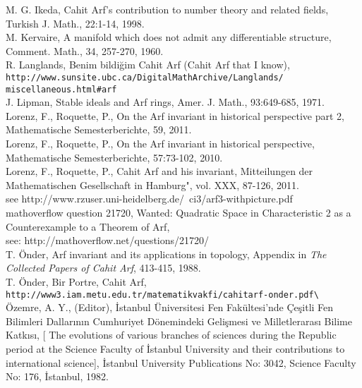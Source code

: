 \documentclass[12pt]{amsart}
\begin{document}
\begin{thebibliography}{10}
 M. G. Ikeda, Cahit Arf's contribution to number theory and related fields, Turkish J. Math., 22:1-14, 1998. \\

 M. Kervaire, A manifold which does not admit any differentiable structure, Comment. Math., 34, 257-270, 1960.\\

 R. Langlands, Benim bildi\u{g}im Cahit Arf (Cahit Arf that I know), {\tt http://www.sunsite.ubc.ca/DigitalMathArchive/Langlands/ \\ miscellaneous.html{\#}arf} \\

 J. Lipman, Stable ideals and Arf rings, Amer. J. Math., 93:649-685, 1971. \\

 Lorenz, F., Roquette, P., On the Arf invariant in historical perspective part 2, Mathematische Semesterberichte, 59, 2011. \\

 Lorenz, F., Roquette, P., On the Arf invariant in historical perspective, Mathematische Semesterberichte, 57:73-102, 2010. \\

 Lorenz, F., Roquette, P., Cahit Arf and his invariant, Mitteilungen der Mathematischen Gesellschaft in Hamburg", vol. XXX, 87-126, 2011. \\
    see http://www.rzuser.uni-heidelberg.de/~ci3/arf3-withpicture.pdf \\

 mathoverflow question 21720, Wanted: Quadratic Space in Characteristic 2 as a Counterexample to a Theorem of Arf, \\ see: http://mathoverflow.net/questions/21720/  \\

 T. \"{O}nder, Arf invariant and its applications in topology, Appendix in {\it The Collected Papers of Cahit Arf}, 413-415, 1988. \\

 T. \"{O}nder, Bir Portre, Cahit Arf, \\
\verb+http://www3.iam.metu.edu.tr/matematikvakfi/cahitarf-onder.pdf\+
\\

 \"{O}zemre, A. Y., (Editor), {\.I}stanbul \"{U}niversitesi Fen Fak\"{u}ltesi'nde \c{C}e\c{s}itli Fen Bilimleri Dallar{\i}n{\i}n Cumhuriyet D\"{o}nemindeki Geli\c{s}mesi ve Milletleraras{\i} Bilime Katk{\i}s{\i}, [ The evolutions of various branches of sciences  during the Republic period at the Science Faculty of {\.I}stanbul University and their contributions to international science], {\.I}stanbul University Publications No: 3042, Science Faculty No: 176, {\.I}stanbul, 1982.\\


\end{thebibliography}
\end{document}
